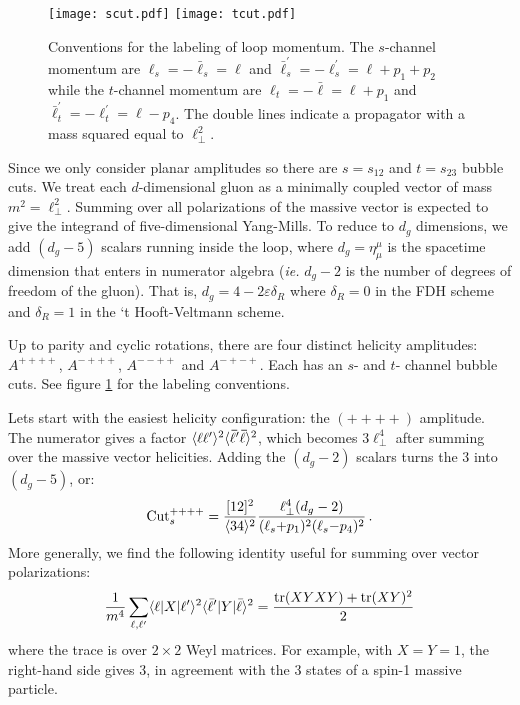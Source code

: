 \documentclass[11pt]{article}
\newcommand{\be}{\begin{equation}}
\newcommand{\ee}{\end{equation}}
\newcommand{\vep}{\varepsilon}
\newcommand{\ab}[1]{\langle#1\rangle}
\renewcommand{\sb}[1]{[#1]}
\newcommand{\keta}[1]{|#1\rangle}
\newcommand{\braa}[1]{\langle#1|}
\begin{document}
\begin{figure}
	\centering
	\texttt{[image: scut.pdf]}	
	\qquad
	\texttt{[image: tcut.pdf]}	
	\caption{\label{fig:s/t cuts}
		Conventions for the labeling of loop momentum. The $s$-channel
		momentum are $\ell_s = -\bar{\ell}_s = \ell$ and 
		$\bar{\ell}^\prime_s = -\ell^\prime_s = \ell+p_1+p_2$ while
		the $t$-channel momentum are $\ell_t = -\bar{\ell} = \ell + p_1$
		and $\bar{\ell}^\prime_t = - \ell^\prime_t = \ell - p_4$.  
		The double lines indicate a propagator with a mass squared equal 
		to $\ell_\perp^2$. 
	}
\end{figure}

Since we only consider planar amplitudes so there are $s=s_{12}$ and $t=s_{23}$ bubble cuts.
We treat each $d$-dimensional gluon as a minimally coupled vector of mass $m^2=\ell_\perp^2$.
Summing over all polarizations of the massive vector is expected to give the integrand of 
five-dimensional Yang-Mills.  To reduce to $d_g$ dimensions, we add $(d_g-5)$ scalars running 
inside the loop, where $d_g=\eta^\mu_\mu$ is the spacetime dimension that enters in numerator 
algebra ({\it ie.} $d_g-2$ is the number of degrees of freedom of the gluon).
That is, $d_g=4-2\vep \delta_R$ where $\delta_R=0$ in the FDH scheme and $\delta_R=1$ in the `t Hooft-Veltmann scheme.

Up to parity and cyclic rotations, there are four distinct helicity amplitudes: $A^{++++}$, $A^{-+++}$, $A^{--++}$ and $A^{-+-+}$.
Each has an $s$- and $t$- channel bubble cuts. See figure \ref{fig:s/t cuts} for the labeling conventions.

Lets start with the easiest helicity configuration: the $(++++)$ amplitude.  
The numerator gives a factor $\ab{{\bf \ell}{\bf \ell'}}^2\ab{{\bf \bar\ell'}{\bf \bar\ell}}^2$, 
which becomes $3\ell_\perp^4$ after summing over the massive vector helicities.  Adding the 
$(d_g-2)$ scalars turns the 3 into $(d_g-5)$, or:
\be
 {\rm Cut}_{s}^{++++} 
 = \frac{\sb{12}^2}{\ab{34}^2} 
 \frac{\ell_\perp^4 (d_g-2)}{(\ell_s{+}p_1)^2 (\ell_s{-}p_4)^2}\,.
\ee
More generally, we find the following identity useful for summing over vector polarizations:
\be
 \frac{1}{m^4}\sum_{\ell,\ell'} \braa{\ell}X\keta{\ell'}^2\braa{\bar\ell'}Y\keta{\bar\ell}^2 =
 \frac{{\rm tr}(X YXY)+{\rm tr}(XY)^2}{2}
\ee
where the trace is over $2\times 2$ Weyl matrices.  For example, with $X=Y=1$, the right-hand side gives 3,
in agreement with the 3 states of a spin-1 massive particle.
\end{document}
